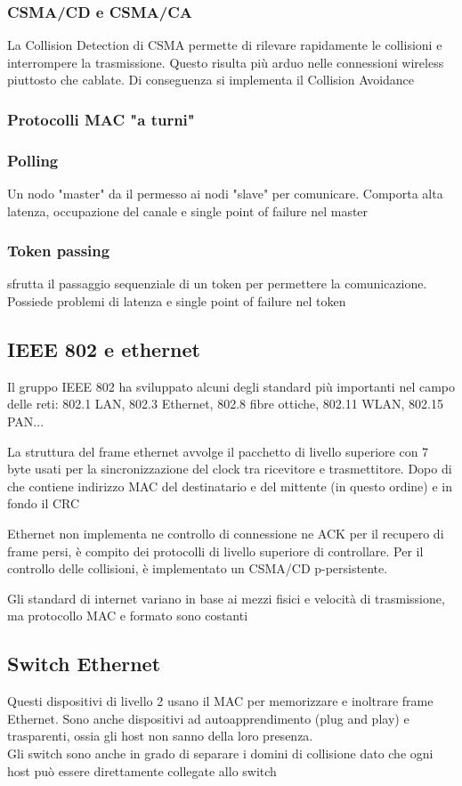 \documentclass[12pt, a4paper]{article}
\begin{document}
\subsubsection{CSMA/CD e CSMA/CA}
La Collision Detection di CSMA permette di rilevare rapidamente le collisioni e interrompere la trasmissione.
Questo risulta più arduo nelle connessioni wireless piuttosto che cablate. Di conseguenza si implementa il 
Collision Avoidance

\subsubsection{Protocolli MAC "a turni"}
\subsubsection*{Polling}
Un nodo "master" da il permesso ai nodi "slave" per comunicare. Comporta alta latenza, occupazione del canale
e single point of failure nel master
\subsubsection*{Token passing}
sfrutta il passaggio sequenziale di un token per permettere la comunicazione. Possiede problemi di latenza e 
single point of failure nel token

\subsection{IEEE 802 e ethernet}
Il gruppo IEEE 802 ha sviluppato alcuni degli standard più importanti nel campo delle reti: 802.1 LAN, 802.3
Ethernet, 802.8 fibre ottiche, 802.11 WLAN, 802.15 PAN...

La struttura del frame ethernet avvolge il pacchetto di livello superiore con 7 byte usati per la 
sincronizzazione del clock tra ricevitore e trasmettitore. Dopo di che contiene indirizzo MAC del destinatario
e del mittente (in questo ordine) e in fondo il CRC

Ethernet non implementa ne controllo di connessione ne ACK per il recupero di frame persi, è compito dei 
protocolli di livello superiore di controllare. Per il controllo delle collisioni, è implementato un 
CSMA/CD p-persistente.

Gli standard di internet variano in base ai mezzi fisici e velocità di trasmissione, ma protocollo MAC e 
formato sono costanti

\subsection{Switch Ethernet}
Questi dispositivi di livello 2 usano il MAC per memorizzare e inoltrare frame Ethernet. Sono anche 
dispositivi ad autoapprendimento (plug and play) e trasparenti, ossia gli host non sanno della loro presenza.\\
Gli switch sono anche in grado di separare i domini di collisione dato che ogni host può essere direttamente
collegate allo switch
\end{document}
